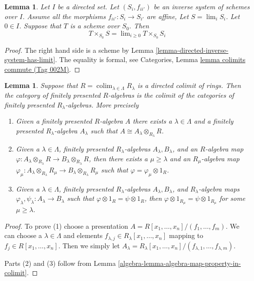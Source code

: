 \documentclass{amsart}
\theoremstyle{plain}
\newtheorem{lemma}[subsection]{Lemma}
\theoremstyle{definition}
\theoremstyle{remark}
\numberwithin{equation}{subsection}
\def\lim{\mathop{\mathrm{lim}}\nolimits}
\def\colim{\mathop{\mathrm{colim}}\nolimits}
\begin{document}
\begin{lemma}
\label{lemma-scheme-over-limit}
Let $I$ be a directed set.
Let $(S_i, f_{ii'})$ be an inverse system of schemes over $I$.
Assume all the morphisms $f_{ii'} : S_i \to S_{i'}$ are affine,
Let $S = \lim_i S_i$. Let $0 \in I$.
Suppose that $T$ is a scheme over $S_0$.
Then
$$
T \times_{S_0} S = \lim_{i \geq 0} T \times_{S_0} S_i
$$
\end{lemma}

\begin{proof}
The right hand side is a scheme by
Lemma \ref{lemma-directed-inverse-system-has-limit}.
The equality is formal, see
Categories, Lemma \href{https://stacks.math.columbia.edu/tag/002M}{lemma colimits commute (Tag 002M)}.
\end{proof}


\begin{lemma}
\label{algebra-lemma-colimit-category-fp-algebras}
Suppose that $R = \colim_{\lambda \in \Lambda} R_\lambda$ is a directed colimit
of rings. Then the category of finitely presented $R$-algebras is
the colimit of the categories of finitely presented $R_\lambda$-algebras.
More precisely
\begin{enumerate}
\item Given a finitely presented $R$-algebra $A$ there exists a
$\lambda \in \Lambda$ and a finitely presented $R_\lambda$-algebra
$A_\lambda$ such that $A \cong A_\lambda \otimes_{R_\lambda} R$.
\item Given a $\lambda \in \Lambda$, finitely presented
$R_\lambda$-algebras $A_\lambda, B_\lambda$, and an $R$-algebra map
$\varphi : A_\lambda \otimes_{R_\lambda} R \to B_\lambda \otimes_{R_\lambda} R$,
then there exists a $\mu \geq \lambda$ and an $R_\mu$-algebra map
$\varphi_\mu : A_\lambda \otimes_{R_\lambda} R_\mu \to
B_\lambda \otimes_{R_\lambda} R_\mu$
such that $\varphi = \varphi_\mu \otimes 1_R$.
\item Given a $\lambda \in \Lambda$, finitely presented
$R_\lambda$-algebras $A_\lambda, B_\lambda$, and $R_\lambda$-algebra maps
$\varphi_\lambda, \psi_\lambda : A_\lambda \to B_\lambda$
such that $\varphi \otimes 1_R = \psi \otimes 1_R$, then
$\varphi \otimes 1_{R_\mu} = \psi \otimes 1_{R_\mu}$ for some
$\mu \geq \lambda$.
\end{enumerate}
\end{lemma}

\begin{proof}
To prove (1) choose a presentation
$A = R[x_1, \ldots, x_n]/(f_1, \ldots, f_m)$.
We can choose a $\lambda \in \Lambda$ and elements
$f_{\lambda, j} \in R_\lambda[x_1, \ldots, x_n]$ mapping to
$f_j \in R[x_1, \ldots, x_n]$.
Then we simply let
$A_\lambda =
R_\lambda[x_1, \ldots, x_n]/(f_{\lambda, 1}, \ldots, f_{\lambda, m})$.

\medskip\noindent
Parts (2) and (3) follow from
Lemma \ref{algebra-lemma-algebra-map-property-in-colimit}.
\end{proof}
\end{document}
